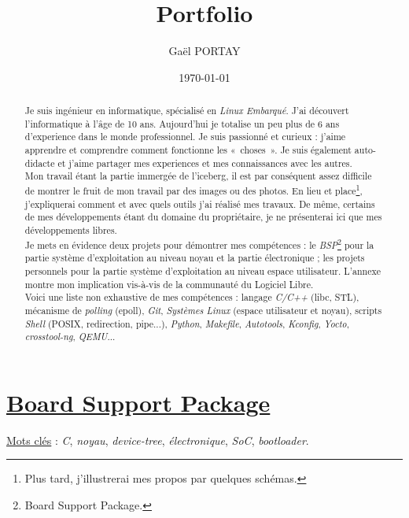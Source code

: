 \documentclass[a4paper]{article}
\title{Portfolio}
\author{Gaël PORTAY}
\date{\today}
\begin{document}
\maketitle

\begin{abstract}
Je suis ingénieur en informatique, spécialisé en \textit{Linux Embarqué}. J'ai découvert l'informatique à l'âge de 10 ans. Aujourd'hui je totalise un peu plus de 6 ans d'experience dans le monde professionnel. Je suis passionné et curieux : j'aime apprendre et comprendre comment fonctionne les «~choses~». Je suis également auto-didacte et j'aime partager mes experiences et mes connaissances avec les autres.\\

Mon travail étant la partie immergée de l'iceberg, il est par conséquent assez difficile de montrer le fruit de mon travail par des images ou des photos. En lieu et place\footnote{Plus tard, j'illustrerai mes propos par quelques schémas.}, j'expliquerai comment et avec quels outils j'ai réalisé mes travaux. De même, certains de mes développements étant du domaine du propriétaire, je ne présenterai ici que mes développements libres.\\

Je mets en évidence deux projets pour démontrer mes compétences : le \textit{BSP}\footnote{Board Support Package.} pour la partie système d'exploitation au niveau noyau et la partie électronique ; les projets personnels pour la partie système d'exploitation au niveau espace utilisateur. L'annexe montre mon implication vis-à-vis de la communauté du Logiciel Libre.\\

Voici une liste non exhaustive de mes compétences : langage \textit{C/C++} (libc, STL), mécanisme de \textit{polling} (epoll), \textit{Git}, \textit{Systèmes Linux} (espace utilisateur et noyau), scripts \textit{Shell} (POSIX, redirection, pipe...), \textit{Python}, \textit{Makefile}, \textit{Autotools}, \textit{Kconfig}, \textit{Yocto}, \textit{crosstool-ng}, \textit{QEMU}...
\end{abstract}
\clearpage

\tableofcontents
\clearpage

\part{\href{https://fr.wikipedia.org/wiki/Board_support_package}{Board Support Package}}

\underline{Mots clés} : \textit{C}, \textit{noyau}, \textit{device-tree}, \textit{électronique}, \textit{SoC}, \textit{bootloader}.\\
\end{document}
